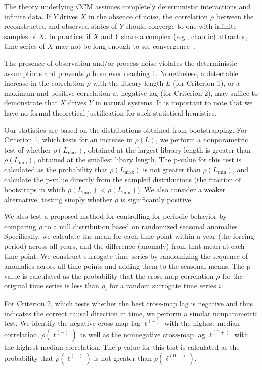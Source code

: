 \documentclass[10pt,letterpaper]{article}
\begin{document}
The theory underlying CCM assumes completely deterministic interactions and infinite data.
If $Y$ drives $X$ in the absence of noise, the correlation $\rho$ between the reconstructed and observed states of $Y$ should converge to one with infinite samples of $X$.
In practice, if $X$ and $Y$ share a complex (e.g., chaotic) attractor, time series of $X$ may not be long enough to see convergence~\cite{Sugihara2012}.

The presence of observation and/or process noise violates the deterministic assumptions and prevents $\rho$ from ever reaching 1.
Nonetheless, a detectable increase in the correlation $\rho$ with the library length $L$ (for Criterion 1), or a maximum and positive correlation at negative lag (for Criterion 2), may suffice to demonstrate that $X$ drives $Y$ in natural systems.
It is important to note that we have no formal theoretical justification for such statistical heuristics.

Our statistics are based on the distributions obtained from bootstrapping.
For Criterion 1, which tests for an increase in $\rho(L)$, we perform a nonparametric test of whether $\rho(L_{\max})$, obtained at the largest library length is greater than $\rho(L_{\min})$, obtained at the smallest libary length.
The p-value for this test is calculated as the probability that $\rho(L_{\max})$ is not greater than $\rho(L_{\min})$, and calculate the p-value directly from the sampled distributions (the fraction of bootstraps in which $\rho(L_{\max}) < \rho(L_{\min})$).
We also consider a weaker alternative, testing simply whether $\rho$ is significantly positive.

We also test a proposed method for controlling for periodic behavior by comparing $\rho$ to a null distribution based on randomized seasonal anomalies~\cite{Deyle2016b}.
Specifically, we calculate the mean for each time point within a year (the forcing period) across all years, and the difference (anomaly) from that mean at each time point.
We construct surrogate time series by randomizing the sequence of anomalies across all time points and adding them to the seasonal means.
The p-value is calculated as the probability that the cross-map correlation $\rho$ for the original time series is less than $\rho_i$ for a random surrogate time series $i$.

For Criterion 2, which tests whether the best cross-map lag is negative and thus indicates the correct causal direction in time, we perform a similar nonparametric test.
We identify the negative cross-map lag $\ell^{(-)}$ with the highest median correlation, $\rho(\ell^{(-)})$ as well as the nonnegative cross-map lag $\ell^{(0+)}$ with the highest median correlation.
The p-value for this test is calculated as the probability that $\rho(\ell^{(-)})$ is not greater than $\rho(\ell^{(0+)})$.
\end{document}
